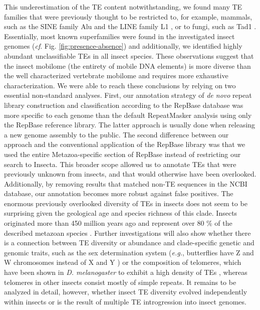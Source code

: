 This underestimation of the TE content notwithstanding, we found many TE
families that were previously thought to be restricted to, for example,
mammals, such as the SINE family Alu \citep{Kriegs2007} and the LINE
family L1 \citep{Liu2003}, or to fungi, such as Tad1
\citep{Cambareri1994}. Essentially, most known superfamilies were found
in the investigated insect genomes (\emph{cf}. Fig.
\ref{fig:presence-absence}) and additionally, we identified highly
abundant unclassifiable TEs in all insect species.  These observations
suggest that the insect mobilome (the entirety of mobile DNA elements)
is more diverse than the well characterized vertebrate mobilome
\citep{Chalopin2015} and requires more exhaustive characterization. We
were able to reach these conclusions by relying on two essential
non-standard analyses. First, our annotation strategy of \emph{de novo}
repeat library construction and classification according to the RepBase
database was more specific to each genome than the default RepeatMasker
analysis using only the RepBase reference library.  The latter approach
is usually done when releasing a new genome assembly to the public. The
second difference between our approach and the conventional application
of the RepBase library was that we used the entire Metazoa-specific
section of RepBase instead of restricting our search to Insecta. This
broader scope allowed us to annotate TEs that were previously unknown
from insects, and that would otherwise have been overlooked.
Additionally, by removing results that matched non-TE sequences in the
NCBI database, our annotation becomes more robust against false
positives. The enormous previously overlooked diversity of TEs in
insects does not seem to be surprising given the geological age and
species richness of this clade. Insects originated more than 450 million
years ago \citep{Misof2014} and represent over 80 \% of the described
metazoan species \citep{Grimaldi2005}. Further investigations will also
show whether there is a connection between TE diversity or abundance and
clade-specific genetic and genomic traits, such as the sex determination
system (\emph{e.g.}, butterflies have Z and W chromosomes instead of X
and Y \citep{Traut1997}) or the composition of telomeres, which have
been shown in \emph{D. melanogaster} to exhibit a high density of TEs
\citep{Levis1993}, whereas telomeres in other insects consist mostly of
simple repeats. It remains to be analyzed in detail, however, whether
insect TE diversity evolved independently within insects or is the
result of multiple TE introgression into insect genomes.

